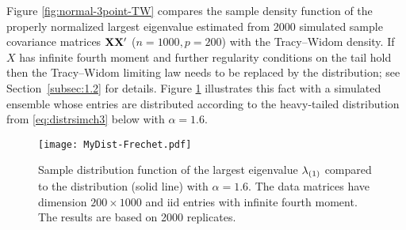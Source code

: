 Figure \ref{fig:normal-3point-TW} compares the sample density function
of the properly normalized largest eigenvalue estimated from 2000 simulated sample covariance matrices ${\mathbf X}{\mathbf X}'$ ($n=1000, p=200$) with
the Tracy--Widom density. If  $X$ has infinite fourth moment and further regularity conditions on the tail hold then the
Tracy--Widom limiting law needs to be replaced by the \Frechet
distribution; see Section~\ref{subsec:1.2} for details. Figure \ref{fig:MyDist-Frechet} illustrates this fact with a
simulated ensemble whose entries are distributed according to
the heavy-tailed distribution from \eqref{eq:distrsimch3} below with $\alpha = 1.6$.
\begin{figure}[htb!]
  \centering
  \texttt{[image: MyDist-Frechet.pdf]}
  \caption{Sample distribution function of the largest eigenvalue $\lambda_{(1)}$
    compared to the \Frechet distribution (solid line) with $\alpha=1.6$. The data matrices have dimension
    $200 \times 1000$ and iid entries with infinite fourth moment. The results are based on 2000 replicates.}
  \label{fig:MyDist-Frechet}
\end{figure}


